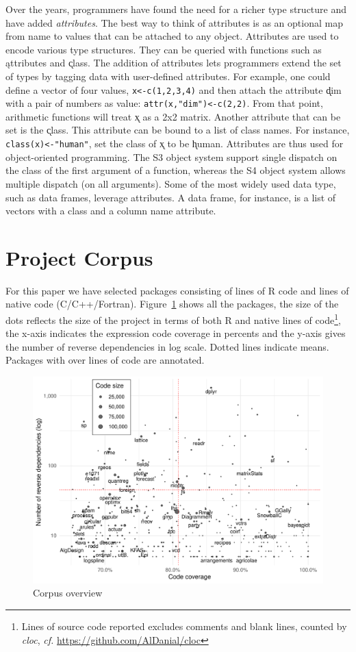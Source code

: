 \documentclass[acmsmall,review,anonymous]{acmart}\settopmatter{printfolios=true,printccs=false,printacmref=false}
\newcommand{\cf}{\emph{cf.}\xspace}
\newcommand{\code}[1]{{\lstinline[style=Rin]!#1!}\xspace}
\begin{document}
Over the years, programmers have found the need for a richer type
structure and have added {\it attributes}. The best way to think of attributes is
as an optional map from name to values that can be attached to any object.
Attributes are used to encode various type structures. They can be queried
with functions such as \k{attributes} and \k{class}.
The addition of attributes lets programmers extend the set of types by
tagging data with user-defined attributes. For example, one could define a
vector of four values, \code{x<-c(1,2,3,4)} and then attach the attribute
\k{dim} with a pair of numbers as value: \code{attr(x,"dim")<-c(2,2)}.  From
that point, arithmetic functions will treat \k{x} as a 2x2 matrix. Another
attribute that can be set is the \k{class}.  This attribute can be bound to
a list of class names. For instance, \code{class(x)<-"human"}, set the class
of \k{x} to be \k{human}.  Attributes are thus used for object-oriented
programming. The S3 object system support single dispatch on the class of
the first argument of a function, whereas the S4 object system allows
multiple dispatch (on all arguments). Some of the most widely used data
type, such as data frames, leverage attributes. A data frame, for instance,
is a list of vectors with a class and a column name attribute.


%
%
\section{Project Corpus}\label{sec:corpus}

For this paper we have selected \CorpusLoadable packages consisting of
\CorpusRCodeRnd lines of R code and \CorpusNativeCodeRnd lines of native
code (C/C++/Fortran). Figure~\ref{fig:corpus} shows all the packages, the
size of the dots reflects the size of the project in terms of both R and
native lines of code\footnote{ Lines of source code reported excludes
  comments and blank lines, counted by \emph{cloc}, \cf
  \url{https://github.com/AlDanial/cloc}}, the x-axis indicates the
expression code coverage in percents and the y-axis gives the number of
reverse dependencies in log scale. Dotted lines indicate means.  Packages
with over \PackageSizeOutierRnd lines of code are annotated.

\begin{figure}[!h]  \centering
  \includegraphics[width=.8\linewidth]{plots/corpus.pdf}
  \caption{Corpus overview}\label{fig:corpus}
\end{figure}
\end{document}
